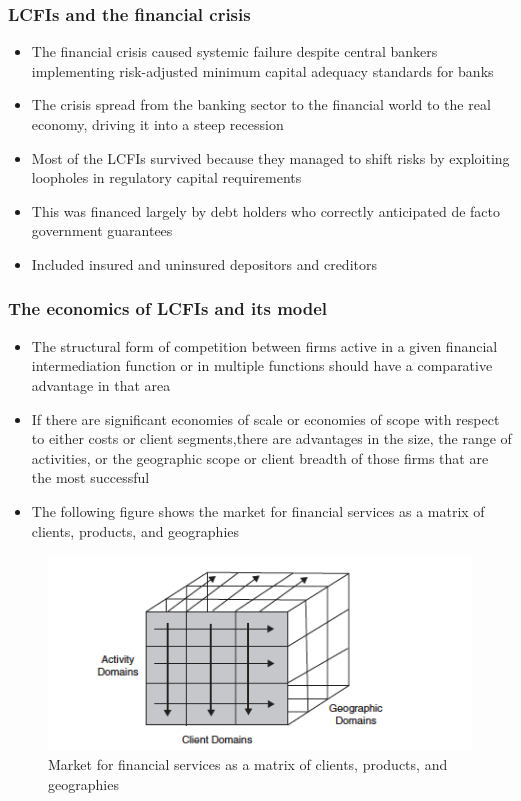 \documentclass[11pt]{beamer}
\begin{document}
\begin{frame}
\frametitle{LCFIs and the financial crisis}
\begin{itemize}
\item The financial crisis caused systemic failure despite central bankers implementing risk-adjusted minimum capital adequacy standards
for banks
\item The crisis spread from the banking sector to the financial world to the real economy, driving it into a steep recession
\item Most of the LCFIs survived because they managed to shift risks by exploiting loopholes in regulatory capital requirements
\item This was financed largely by debt holders who correctly anticipated de facto government guarantees
\item Included insured and uninsured depositors and creditors
\end{itemize}
\end{frame}

\begin{frame}
\frametitle{The economics of LCFIs and its model}
\begin{itemize}
\item The structural form of competition between firms active in a given financial intermediation function or in multiple functions should have a comparative advantage in that area
\item If there are significant economies of scale or economies of scope with respect to either costs or client segments,there are advantages in the size, the range of activities, or the geographic scope or client breadth of those firms that are the most successful
\item The following figure shows the market for financial services as a matrix of clients, products, and geographies
\end{itemize}
\end{frame}

\begin{frame}
\begin{figure}
\includegraphics[width=\textwidth]{7_2.png}
\caption{Market for financial services as a matrix of clients, products, and geographies}
\end{figure}
\end{frame}
\end{document}
